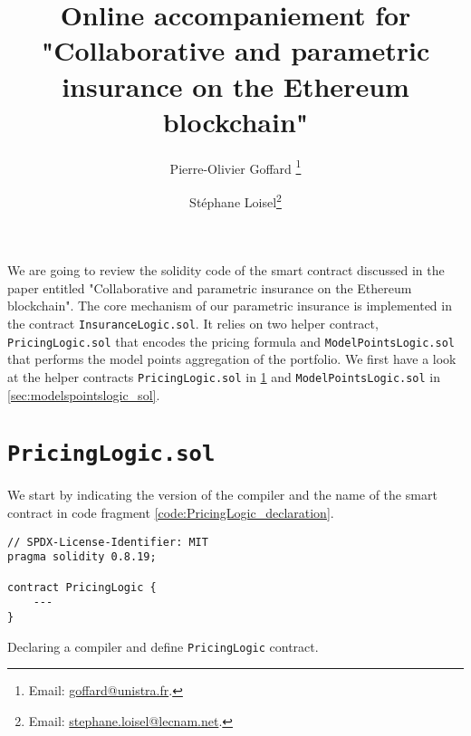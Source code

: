 \documentclass[10pt]{article}
\begin{document}
\title{Online accompaniement for "Collaborative and parametric insurance on the Ethereum blockchain"}
\author[1]{Pierre-Olivier Goffard \footnote{Email: \href{mailto:goffard@unistra.fr}{goffard@unistra.fr}.}}
\author[2]{Stéphane Loisel\footnote{Email: \href{mailto:stephane.loisel@lecnam.net}{stephane.loisel@lecnam.net}.}}

\maketitle
\vspace{3mm}


We are going to review the solidity code of the smart contract discussed in the paper entitled "Collaborative and parametric insurance on the Ethereum blockchain". The core mechanism of our parametric insurance is implemented in the contract \texttt{InsuranceLogic.sol}. It relies on two helper contract, \texttt{PricingLogic.sol} that encodes the pricing formula and \texttt{ModelPointsLogic.sol} that performs the model points aggregation of the portfolio. We first have a look at the helper contracts \texttt{PricingLogic.sol} in \cref{sec:pricinglogic_sol} and \texttt{ModelPointsLogic.sol} in \cref{sec:modelspointslogic_sol}.

\section{\texttt{PricingLogic.sol}}\label{sec:pricinglogic_sol}

We start by indicating the version of the compiler and the name of the smart contract in code fragment \ref{code:PricingLogic_declaration}.

\begin{codefragment}[!ht]
\begin{lstlisting}[language=Solidity]
// SPDX-License-Identifier: MIT
pragma solidity 0.8.19;

contract PricingLogic {
    ---
}
\end{lstlisting}
    \caption{Declaring a compiler and define \texttt{PricingLogic} contract.}
    \label{code:PricingLogic_declaration}
\end{codefragment}
\end{document}
